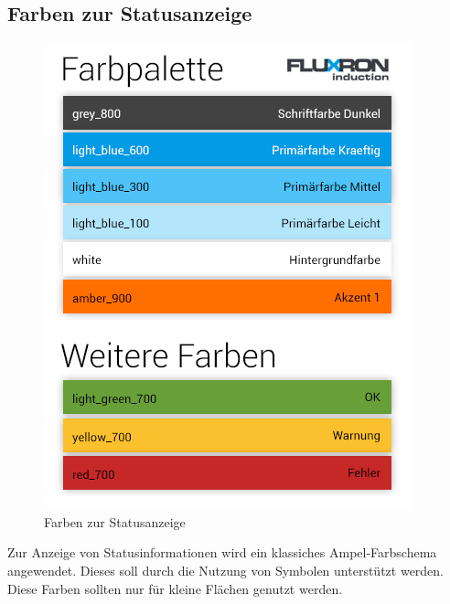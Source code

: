 \subsection{Farben zur Statusanzeige}
\label{subsec:Farben zur Statusanzeige}
\begin{figure}[H]
    \begin{center}
        \includegraphics[trim=0 0 0 370,clip,scale=0.7]{uiux/res/basic_colors}
    \end{center}
    \caption{Farben zur Statusanzeige}
\end{figure}
Zur Anzeige von Statusinformationen wird ein klassiches Ampel-Farbschema angewendet. Dieses soll durch die Nutzung von Symbolen unterstützt werden. Diese Farben sollten nur für kleine Flächen genutzt werden.